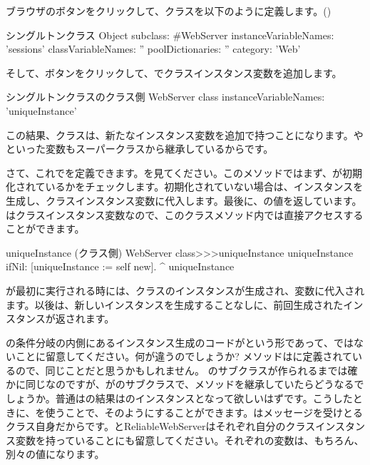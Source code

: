 \documentclass[a4paper,10pt,twoside]{book}
\begin{document}
ブラウザのボタンをクリックして、クラスを以下のように定義します。()

\begin{classdef}[singleton]{シングルトンクラス}
Object subclass: #WebServer
	instanceVariableNames: 'sessions' 	
	classVariableNames: '' 	
	poolDictionaries: '' 	
	category: 'Web'
\end{classdef}

そして、ボタンをクリックして、でクラスインスタンス変数を追加します。

\begin{classdef}[webserver]{シングルトンクラスのクラス側}
WebServer class 	
	instanceVariableNames: 'uniqueInstance'
\end{classdef}

この結果、クラスは、新たなインスタンス変数を追加で持つことになります。やといった変数もスーパークラスから継承しているからです。

さて、これでを定義できます。を見てください。このメソッドではまず、が初期化されているかをチェックします。初期化されていない場合は、インスタンスを生成し、クラスインスタンス変数に代入します。最後に、の値を返しています。はクラスインスタンス変数なので、このクラスメソッド内では直接アクセスすることができます。
    
\begin{method}[uniqueInstance]{uniqueInstance (クラス側)}
WebServer class>>>uniqueInstance
     uniqueInstance ifNil: [uniqueInstance := self new].
     ^ uniqueInstance
\end{method}

が最初に実行される時には、クラスのインスタンスが生成され、変数に代入されます。以後は、新しいインスタンスを生成することなしに、前回生成されたインスタンスが返されます。

の条件分岐の内側にあるインスタンス生成のコードがという形であって、ではないことに留意してください。何が違うのでしょうか?
メソッドはに定義されているので、同じことだと思うかもしれません。
のサブクラスが作られるまでは確かに同じなのですが、がのサブクラスで、メソッドを継承していたらどうなるでしょうか。普通はの結果はのインスタンスとなって欲しいはずです。こうしたときに、\self を使うことで、そのようにすることができます。\self はメッセージを受けとるクラス自身だからです。と{ReliableWebServer}はそれぞれ自分のクラスインスタンス変数を持っていることにも留意してください。それぞれの変数は、もちろん、別々の値になります。
\end{document}
